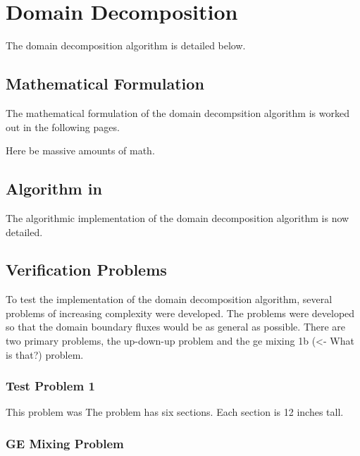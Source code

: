 \chapter{Domain Decomposition}
\label{chap:domain_decomposition}
The domain decomposition algorithm is detailed below.

\section{Mathematical Formulation}
\label{sec:dd:math}
The mathematical formulation of the domain decompsition algorithm is worked out in the following pages.

Here be massive amounts of math.

\section{Algorithm in \cobra{}}
\label{sec:dd:algo}

The algorithmic implementation of the domain decomposition algorithm is now detailed.

\section{Verification Problems}
\label{sec:dd:verify}
To test the implementation of the domain decomposition algorithm, several problems of increasing complexity were developed.
The problems were developed so that the domain boundary fluxes would be as general as possible.
There are two primary problems, the up-down-up problem and the ge mixing 1b (<- What is that?) problem.

\subsection{Test Problem 1}
\label{ss:dd:ver:tp1}
This problem was 
The problem has six sections.
Each section is 12 inches tall.

\subsection{GE Mixing Problem}
\label{ss:dd:ver:gem}



